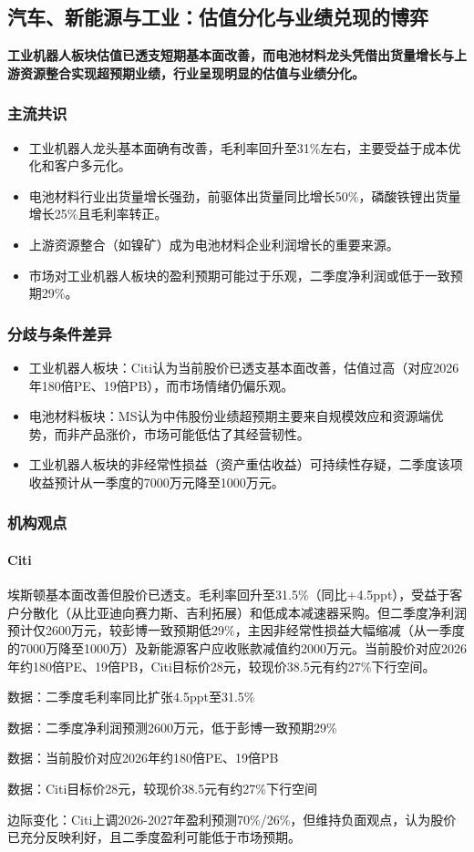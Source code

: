\documentclass[11pt]{ctexart}
\begin{document}
\subsection{汽车、新能源与工业：估值分化与业绩兑现的博弈}
\textbf{工业机器人板块估值已透支短期基本面改善，而电池材料龙头凭借出货量增长与上游资源整合实现超预期业绩，行业呈现明显的估值与业绩分化。}
\subsubsection*{主流共识}
\begin{itemize}
  \item 工业机器人龙头基本面确有改善，毛利率回升至31\%左右，主要受益于成本优化和客户多元化。
  \item 电池材料行业出货量增长强劲，前驱体出货量同比增长50\%，磷酸铁锂出货量增长25\%且毛利率转正。
  \item 上游资源整合（如镍矿）成为电池材料企业利润增长的重要来源。
  \item 市场对工业机器人板块的盈利预期可能过于乐观，二季度净利润或低于一致预期29\%。
\end{itemize}
\subsubsection*{分歧与条件差异}
\begin{itemize}
  \item 工业机器人板块：Citi认为当前股价已透支基本面改善，估值过高（对应2026年180倍PE、19倍PB），而市场情绪仍偏乐观。
  \item 电池材料板块：MS认为中伟股份业绩超预期主要来自规模效应和资源端优势，而非产品涨价，市场可能低估了其经营韧性。
  \item 工业机器人板块的非经常性损益（资产重估收益）可持续性存疑，二季度该项收益预计从一季度的7000万元降至1000万元。
\end{itemize}
\subsubsection*{机构观点}
\paragraph{Citi} 埃斯顿基本面改善但股价已透支。毛利率回升至31.5\%（同比+4.5ppt），受益于客户分散化（从比亚迪向赛力斯、吉利拓展）和低成本减速器采购。但二季度净利润预计仅2600万元，较彭博一致预期低29\%，主因非经常性损益大幅缩减（从一季度的7000万降至1000万）及新能源客户应收账款减值约2000万元。当前股价对应2026年约180倍PE、19倍PB，Citi目标价28元，较现价38.5元有约27\%下行空间。
{\small\color{refgray}数据：二季度毛利率同比扩张4.5ppt至31.5\%\par}
{\small\color{refgray}数据：二季度净利润预测2600万元，低于彭博一致预期29\%\par}
{\small\color{refgray}数据：当前股价对应2026年约180倍PE、19倍PB\par}
{\small\color{refgray}数据：Citi目标价28元，较现价38.5元有约27\%下行空间\par}
{\small\color{refgray}边际变化：Citi上调2026-2027年盈利预测70\%/26\%，但维持负面观点，认为股价已充分反映利好，且二季度盈利可能低于市场预期。\par}
\end{document}
